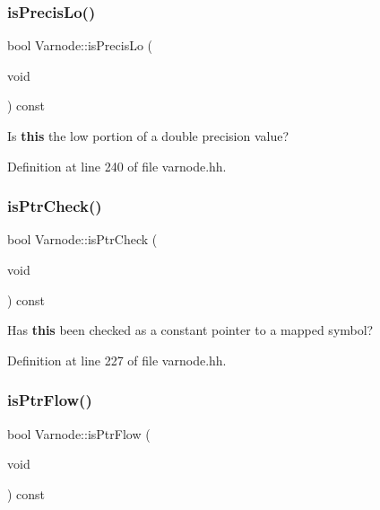 \subsubsection{\texorpdfstring{isPrecisLo()}{isPrecisLo()}}
{\footnotesize\ttfamily bool Varnode\+::is\+Precis\+Lo (\begin{DoxyParamCaption}\item[{void}]{ }\end{DoxyParamCaption}) const\hspace{0.3cm}{\ttfamily [inline]}}



Is {\bfseries{this}} the low portion of a double precision value? 



Definition at line 240 of file varnode.\+hh.

\mbox{\label{class_varnode_ae66b877df6f8f3dd79630a1ce2236997}} 
\subsubsection{\texorpdfstring{isPtrCheck()}{isPtrCheck()}}
{\footnotesize\ttfamily bool Varnode\+::is\+Ptr\+Check (\begin{DoxyParamCaption}\item[{void}]{ }\end{DoxyParamCaption}) const\hspace{0.3cm}{\ttfamily [inline]}}



Has {\bfseries{this}} been checked as a constant pointer to a mapped symbol? 



Definition at line 227 of file varnode.\+hh.

\mbox{\label{class_varnode_abd10110ad081fb74cdce9eb1b9ddd28d}} 
\subsubsection{\texorpdfstring{isPtrFlow()}{isPtrFlow()}}
{\footnotesize\ttfamily bool Varnode\+::is\+Ptr\+Flow (\begin{DoxyParamCaption}\item[{void}]{ }\end{DoxyParamCaption}) const\hspace{0.3cm}{\ttfamily [inline]}}



